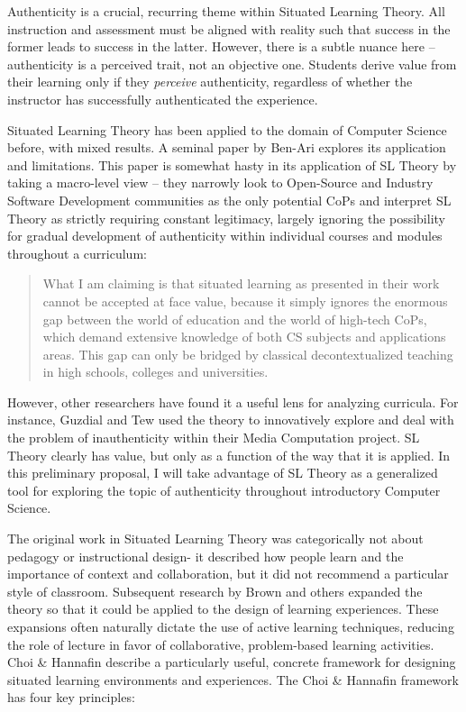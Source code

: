Authenticity is a crucial, recurring theme within Situated Learning Theory.
All instruction and assessment must be aligned with reality such that success in the former leads to success in the latter.
However, there is a subtle nuance here -- authenticity is a perceived trait, not an objective one.
Students derive value from their learning only if they \textit{perceive} authenticity, regardless of whether the instructor has successfully authenticated the experience.

Situated Learning Theory has been applied to the domain of Computer Science before, with mixed results. A seminal paper by Ben-Ari \cite{ben2004situated} explores its application and limitations.
This paper is somewhat hasty in its application of SL Theory by taking a macro-level view -- they narrowly look to Open-Source and Industry Software Development communities as the only potential CoPs and interpret SL Theory as strictly requiring constant legitimacy, largely ignoring the possibility for gradual development of authenticity within individual courses and modules throughout a curriculum:

\begin{quote}
What I am claiming is that situated learning as presented in their work cannot be accepted at face value, because it simply ignores the enormous gap between the world of education and the world of high-tech CoPs, which demand extensive knowledge of both CS subjects and applications areas.
This gap can only be bridged by classical decontextualized teaching in high schools, colleges and universities.
\end{quote}

However, other researchers have found it a useful lens for analyzing curricula.
For instance, Guzdial and Tew \cite{guzdial2006imagineering} used the theory to innovatively explore and deal with the problem of inauthenticity within their Media Computation project.
SL Theory clearly has value, but only as a function of the way that it is applied.
In this preliminary proposal, I will take advantage of SL Theory as a generalized tool for exploring the topic of authenticity throughout introductory Computer Science.

The original work in Situated Learning Theory was categorically not about pedagogy or instructional design- it described how people learn and the importance of context and collaboration, but it did not recommend a particular style of classroom.
Subsequent research by Brown \cite{brown1989situated} and others expanded the theory so that it could be applied to the design of learning experiences.
These expansions often naturally dictate the use of active learning techniques, reducing the role of lecture in favor of collaborative, problem-based learning activities.
Choi \& Hannafin \cite{situated-cognition} describe a particularly useful, concrete framework for designing situated learning environments and experiences.
The Choi \& Hannafin framework has four key principles:

